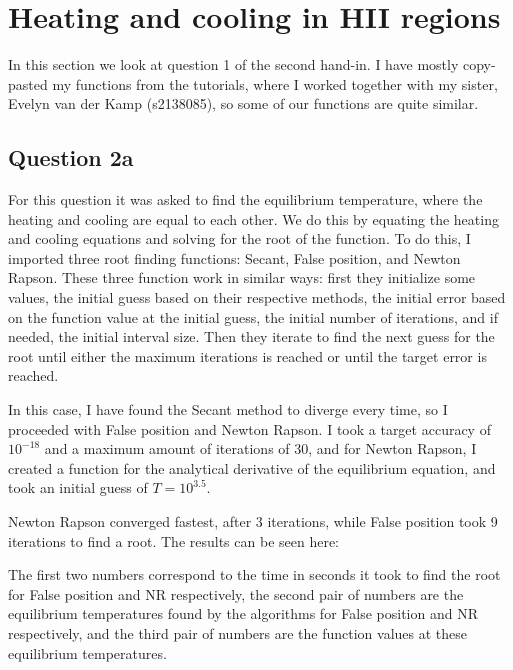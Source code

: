 \section{Heating and cooling in HII regions}

In this section we look at question 1 of the second hand-in. 
I have mostly copy-pasted my functions from the tutorials, where I worked together with my sister,
Evelyn van der Kamp (s2138085), so some of our functions are quite similar.



\subsection{Question 2a}

For this question it was asked to find the equilibrium temperature, where the heating and cooling are equal to each other.
We do this by equating the heating and cooling equations and solving for the root of the function.
To do this, I imported three root finding functions: Secant, False position, and Newton Rapson.
These three function work in similar ways: first they initialize some values, the initial guess based on their respective methods, the initial error based on the function value at the initial guess, the initial number of iterations, and if needed, the initial interval size.
Then they iterate to find the next guess for the root until either the maximum iterations is reached or until the target error is reached. 

In this case, I have found the Secant method to diverge every time, so I proceeded with False position and Newton Rapson. 
I took a target accuracy of $10^{-18}$ and a maximum amount of iterations of 30, and for Newton Rapson, I created a function for the analytical derivative of the equilibrium equation, and took an initial guess of $T = 10^{3.5}$.

Newton Rapson converged fastest, after 3 iterations, while False position took 9 iterations to find a root. 
The results can be seen here:



The first two numbers correspond to the time in seconds it took to find the root for False position and NR respectively, the second pair of numbers are the equilibrium temperatures found by the algorithms for False position and NR respectively, and the third pair of numbers are the function values at these equilibrium temperatures.

